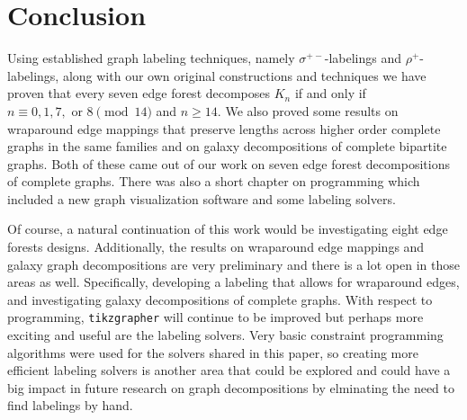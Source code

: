 \chapter{Conclusion}
\label{conclusion_chapter}

Using established graph labeling techniques, namely $\sigma^{+-}$-labelings and $\rho^{+}$-labelings, along with our own original constructions and techniques we have proven that every seven edge forest decomposes $K_{n}$ if and only if $n\equiv 0,1,7,\text{ or }8\pmod{14}$ and $n\geq 14$. We also proved some results on wraparound edge mappings that preserve lengths across higher order complete graphs in the same families and on galaxy decompositions of complete bipartite graphs. Both of these came out of our work on seven edge forest decompositions of complete graphs. There was also a short chapter on programming which included a new graph visualization software and some labeling solvers.

Of course, a natural continuation of this work would be investigating eight edge forests designs. Additionally, the results on wraparound edge mappings and galaxy graph decompositions are very preliminary and there is a lot open in those areas as well. Specifically, developing a labeling that allows for wraparound edges, and investigating galaxy decompositions of complete graphs. With respect to programming, \verb|tikzgrapher| will continue to be improved but perhaps more exciting and useful are the labeling solvers. Very basic constraint programming algorithms were used for the solvers shared in this paper, so creating more efficient labeling solvers is another area that could be explored and could have a big impact in future research on graph decompositions by elminating the need to find labelings by hand.

